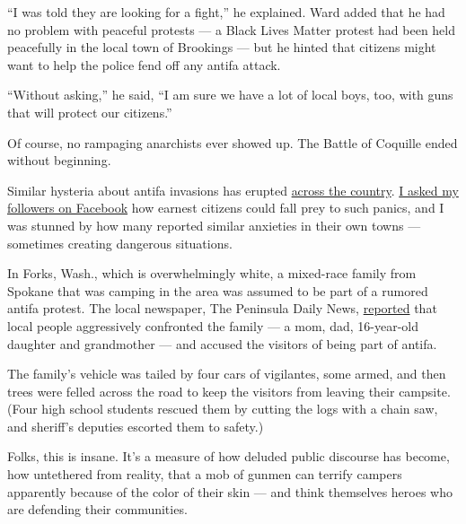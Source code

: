 ``I was told they are looking for a fight,'' he explained. Ward added
that he had no problem with peaceful protests --- a Black Lives Matter
protest had been held peacefully in the local town of Brookings --- but
he hinted that citizens might want to help the police fend off any
antifa attack.

``Without asking,'' he said, ``I am sure we have a lot of local boys,
too, with guns that will protect our citizens.''

Of course, no rampaging anarchists ever showed up. The Battle of
Coquille ended without beginning.

Similar hysteria about antifa invasions has erupted
\href{https://www.detroitnews.com/story/news/nation/2020/06/02/false-claims-antifa-protesters-plague-small-us-cities/111899444/}{across
the country}.
\href{https://www.facebookcorewwwi.onion/kristof/posts/10159885205317891?__xts__\%5b0\%5d=68.ARAVnkUTUgiRHe7PEE2SsJ8HPxpc50fo9LzoUWxjsgXHvmgtl-NE8VFhGrr4qBIZt7cxN9cvFsH8nVaD0IAVqLeyGe7KsnhjpJxJb8pio_yTPi6m0aKQr8SwTr1950y6fKrObouJIz5ai3L0XEqb0RcN7XnNtGyglUdu76Md2B5qCreEQMveNjWjaw2lNQEAYlSuU7uENm2F8fae1WBozYwBtzgYayLDzVJhZ_VJMsDq9qhaDDQVQ8v3ZxNpcLWJz2PlRPJ8lcd_QsctED82cujRarYxRMSyx0RwGUj-zvljdBuF-sPSdIKyFNo5GE3RBu_qSCL7TUQ\&__tn__=-R}{I
asked my followers on Facebook} how earnest citizens could fall prey to
such panics, and I was stunned by how many reported similar anxieties in
their own towns --- sometimes creating dangerous situations.

In Forks, Wash., which is overwhelmingly white, a mixed-race family from
Spokane that was camping in the area was assumed to be part of a rumored
antifa protest. The local newspaper, The Peninsula Daily News,
\href{https://www.peninsuladailynews.com/crime/family-harassed-in-forks-after-being-accused-of-being-members-of-antifa/}{reported}
that local people aggressively confronted the family --- a mom, dad,
16-year-old daughter and grandmother --- and accused the visitors of
being part of antifa.

The family's vehicle was tailed by four cars of vigilantes, some armed,
and then trees were felled across the road to keep the visitors from
leaving their campsite. (Four high school students rescued them by
cutting the logs with a chain saw, and sheriff's deputies escorted them
to safety.)

Folks, this is insane. It's a measure of how deluded public discourse
has become, how untethered from reality, that a mob of gunmen can
terrify campers apparently because of the color of their skin --- and
think themselves heroes who are defending their communities.


